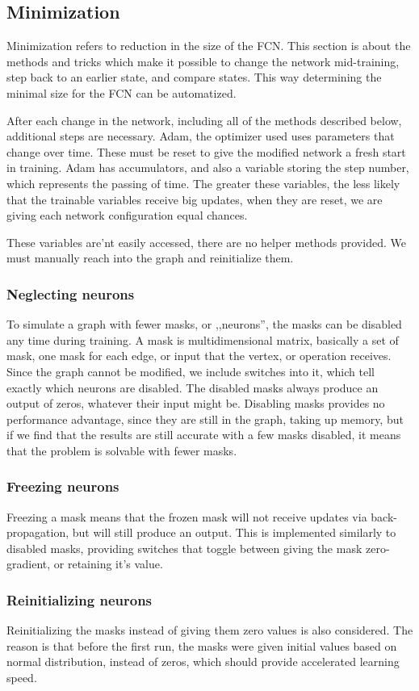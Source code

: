 \documentclass[a4paper,12pt]{article}
\begin{document}
\subsection{Minimization}
Minimization refers to reduction in the size of the FCN. This section is about the methods and tricks which make it possible to change the network mid-training, step back to an earlier state, and compare states. This way determining the minimal size for the FCN can be automatized.\par
After each change in the network, including all of the methods described below, additional steps are necessary. Adam, the optimizer used uses parameters that change over time. These must be reset to give the modified network a fresh start in training. Adam has accumulators, and also a variable storing the step number, which represents the passing of time. The greater these variables, the less likely that the trainable variables receive big updates, when they are reset, we are giving each network configuration equal chances.\par
These variables are'nt easily accessed, there are no helper methods provided. We must manually reach into the graph and reinitialize them.
\subsubsection{Neglecting neurons}
To simulate a graph with fewer masks, or ,,neurons'', the masks can be disabled any time during training. A mask is  multidimensional matrix, basically a set of mask, one mask for each edge, or input that the vertex, or operation receives. Since the graph cannot be modified, we include switches into it, which tell exactly which neurons are disabled. The disabled masks always produce an output of zeros, whatever their input might be. Disabling masks provides no performance advantage, since they are still in the graph, taking up memory, but if we find that the results are still accurate with a few masks disabled, it means that the problem is solvable with fewer masks.
\subsubsection{Freezing neurons}
Freezing a mask means that the frozen mask will not receive updates via back-propagation, but will still produce an output. This is implemented similarly to disabled masks, providing switches that toggle between giving the mask zero-gradient, or retaining it's value.
\subsubsection{Reinitializing neurons}
Reinitializing the masks instead of giving them zero values is also considered. The reason is that before the first run, the masks were given initial values based on normal distribution, instead of zeros, which should provide accelerated learning speed.
\end{document}
